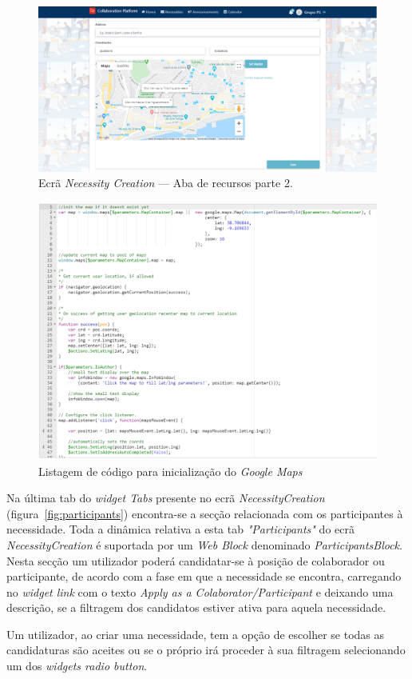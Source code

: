 \begin{figure}[H]
  \centering 
  \includegraphics[scale=0.4]{figures/Resources2.png}
  \caption{Ecrã \textit{Necessity Creation} --- Aba de recursos parte 2.}\label{fig:Resources2}
\end{figure}


\begin{figure}[H]
  \centering 
  \includegraphics[scale=0.4]{figures/googleMapsInitCode.png}
  \caption{Listagem de código para inicialização do \textit{Google Maps}}\label{fig:googleMapsInitCode}
\end{figure}


Na última tab do \textit{widget Tabs} presente no ecrã \textit{NecessityCreation} (figura~\ref{fig:participants}) encontra-se a secção relacionada com os participantes à necessidade.
Toda a dinâmica relativa a esta tab \textit{"Participants"} do ecrã \textit{NecessityCreation} é suportada por um \textit{Web Block} denominado \textit{ParticipantsBlock}.
Nesta secção um utilizador poderá candidatar-se à posição de colaborador ou participante, de acordo com a fase em que a necessidade se encontra, carregando no \textit{widget link} com o texto \textit{Apply as a Colaborator/Participant} e deixando uma descrição, se a filtragem dos candidatos estiver ativa para aquela necessidade.
\par
Um utilizador, ao criar uma necessidade, tem a opção de escolher se todas as candidaturas são aceites ou se o próprio irá proceder à sua filtragem selecionando um dos \textit{widgets radio button}.  

